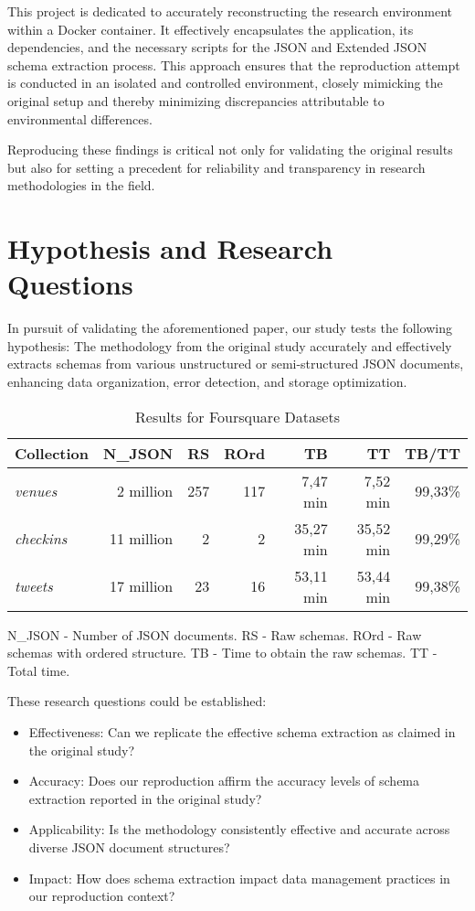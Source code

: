 \documentclass[sigconf, nonacm]{acmart}
\begin{document}
This project is dedicated to accurately reconstructing the research environment within a Docker container. It effectively encapsulates the application, its dependencies, and the necessary scripts for the JSON and Extended JSON schema extraction process. This approach ensures that the reproduction attempt is conducted in an isolated and controlled environment, closely mimicking the original setup and thereby minimizing discrepancies attributable to environmental differences. 

Reproducing these findings is critical not only for validating the original results but also for setting a precedent for reliability and transparency in research methodologies in the field.


\section{Hypothesis and Research Questions}

In pursuit of validating the aforementioned paper, our study tests the following hypothesis: The methodology from the original study accurately and effectively extracts schemas from various unstructured or semi-structured JSON documents, enhancing data organization, error detection, and storage optimization.

\begin{table}[h!]
\centering
\caption{Results for Foursquare Datasets}
\label{tab:my-table}
\begin{footnotesize}
\begin{tabular}{@{}lrrrrrr@{}}
\toprule
Collection & N\_JSON   & RS & ROrd & TB  & TT      & TB/TT  \\ \midrule
\textit{venues}     & 2 million  & 257 & 117  & 7,47 min & 7,52 min & 99,33\% \\
\textit{checkins}   & 11 million & 2   & 2    & 35,27 min & 35,52 min & 99,29\% \\
\textit{tweets}     & 17 million & 23  & 16   & 53,11 min & 53,44 min & 99,38\% \\ \bottomrule
\end{tabular}
\end{footnotesize}
\smallskip
\footnotesize{N\_JSON - Number of JSON documents. RS - Raw schemas. ROrd - Raw schemas with ordered structure. TB - Time to obtain the raw schemas. TT - Total time.}
\end{table}

These research questions could be established:
\begin{itemize}
\item Effectiveness: Can we replicate the effective schema extraction as claimed in the original study?
\item Accuracy: Does our reproduction affirm the accuracy levels of schema extraction reported in the original study?
\item Applicability: Is the methodology consistently effective and accurate across diverse JSON document structures?
\item Impact: How does schema extraction impact data management practices in our reproduction context?
\end{itemize}
\end{document}
